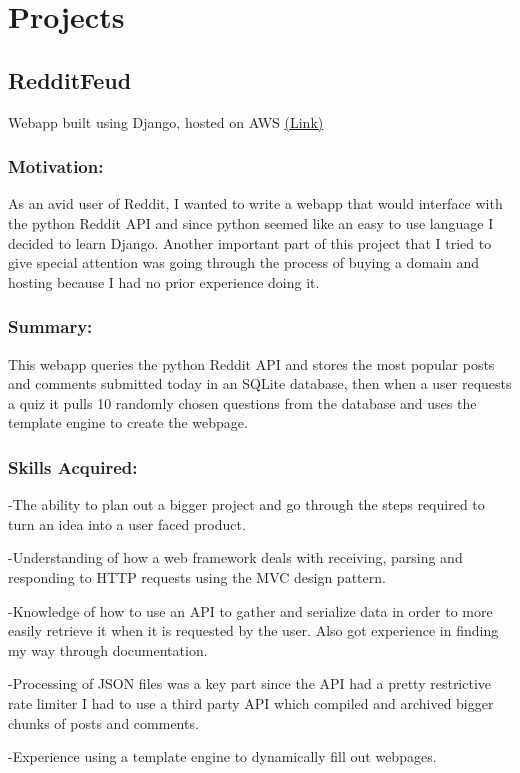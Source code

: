 \documentclass[a4paper,hidelinks,11pt]{article}
\begin{document}
\section{Projects}
\subsection{RedditFeud}
Webapp built using Django, hosted on AWS \href{https:\\www.redditfeud.com}{(Link)}
\subsubsection{Motivation:}
As an avid user of Reddit, I wanted to write a webapp that would interface with the python Reddit API and
since python seemed like an easy to use language I decided to learn Django. Another important part of this
project that I tried to give special attention was going through the process of buying a domain and hosting
because I had no prior experience doing it.

\subsubsection{Summary:}
This webapp queries the python Reddit API and stores the most popular posts and comments submitted today 
in an SQLite database, then when a user requests a quiz it pulls 10 randomly chosen questions from the
database and uses the template engine to create the webpage.
\subsubsection{Skills Acquired:}

-The ability to plan out a bigger project and go through the steps required to turn an idea into a user faced
product.

-Understanding of how a web framework deals with receiving, parsing and responding to HTTP requests using
the MVC design pattern.

-Knowledge of how to use an API to gather and serialize data in order to more easily retrieve it
when it is requested by the user. Also got experience in finding my way through documentation.

-Processing of JSON files was a key part since the API had a pretty restrictive rate limiter I had to use a
third party API which compiled and archived bigger chunks of posts and comments.

-Experience using a template engine to dynamically fill out webpages.
\end{document}
